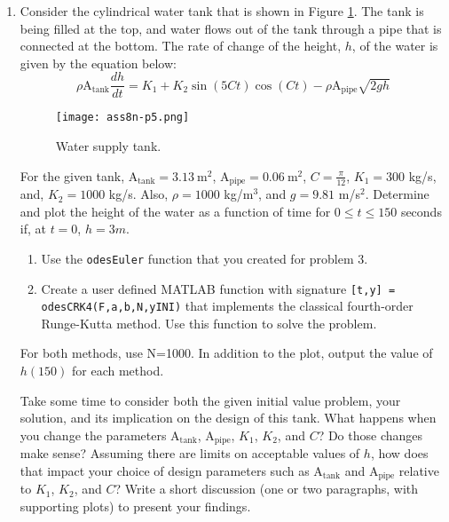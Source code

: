 \begin{fullwidth}
\begin{enumerate}
\item Consider the cylindrical water tank that is shown in Figure \ref{fig:ass8n-p5}.  The tank is being filled at the top, and water flows out of the tank through a pipe that is connected at the bottom.  The rate of change of the height, $h$, of the water is given by the equation below:
\begin{equation*}
\rho \text{A}_{\text{tank}}\frac{dh}{dt} = K_1 + K_2 \sin{(5Ct)}\cos{(Ct)}-\rho \text{A}_{\text{pipe}}\sqrt{2gh}
\end{equation*}
\begin{figure}[h!]
\texttt{[image: ass8n-p5.png]}
\caption{Water supply tank.}
\label{fig:ass8n-p5}
\end{figure}
For the given tank, $\text{A}_{\text{tank}}=3.13 \ \text{m}^2$, $\text{A}_{\text{pipe}}=0.06 \ \text{m}^2$, $C=\frac{\pi}{12}$, $K_1=300$ kg/s, and, $K_2=1000$ kg/s.  Also, $\rho = 1000$ kg/m$^{3}$, and $g=9.81$ m/s$^{2}$.  Determine and plot the height of the water as a function of time for $0 \le t \le 150$ seconds if, at $t=0$, $h=3m$.
\begin{enumerate}
\item Use the \lstinline[style=myMatlab]{odesEuler} function that you created for problem 3.
\item Create a user defined MATLAB function with signature \lstinline[style=myMatlab]{[t,y] = odesCRK4(F,a,b,N,yINI)} that implements the classical fourth-order Runge-Kutta method.  Use this function to solve the problem.  

\end{enumerate}
For both methods, use N=1000.  In addition to the plot, output the value of $h(150)$ for each method.

Take some time to consider both the given initial value problem, your solution, and its implication on the design of this tank.  What happens when you change the parameters $\text{A}_{\text{tank}}$, $\text{A}_{\text{pipe}}$, $K_1$, $K_2$, and $C$?  Do those changes make sense?  Assuming there are limits on acceptable values of $h$, how does that impact your choice of design parameters such as $\text{A}_{\text{tank}}$ and $\text{A}_{\text{pipe}}$ relative to $K_1$, $K_2$, and $C$?  Write a short discussion (one or two paragraphs, with supporting plots) to present your findings.

\vspace{1.0cm}


\end{enumerate}
\end{fullwidth}

